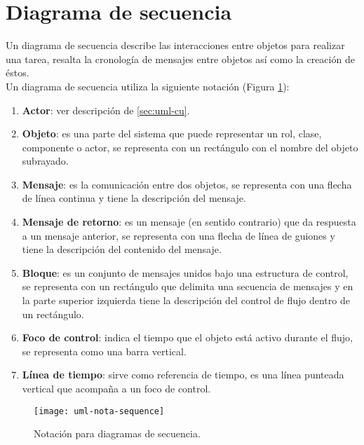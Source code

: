 \section{Diagrama de secuencia}\label{sec:uml-seq}
Un diagrama de secuencia describe las interacciones entre objetos para realizar una tarea, resalta la cronología de mensajes entre objetos así como la creación de éstos\cite{UMLClassroom, SoftwareEngineeringUML}.\\
Un diagrama de secuencia utiliza la siguiente notación\cite{UMLClassroom, SoftwareEngineeringUML} (Figura \ref{fig:uml-nota-sequence}):
\begin{enumerate}
  \item \textbf{Actor}: ver descripción de \ref{sec:uml-cu}.
  \item \textbf{Objeto}: es una parte del sistema que puede representar un rol, clase, componente o actor, se representa con un rectángulo con el nombre del objeto subrayado.
  \item \textbf{Mensaje}: es la comunicación entre dos objetos, se representa con una flecha de línea continua y tiene la descripción del mensaje.
  \item \textbf{Mensaje de retorno}: es un mensaje (en sentido contrario) que da respuesta a un mensaje anterior, se representa con una flecha de línea de guiones y tiene la descripción del contenido del mensaje.
  \item \textbf{Bloque}: es un conjunto de mensajes unidos bajo una estructura de control, se representa con un rectángulo que delimita una secuencia de mensajes y en la parte superior izquierda tiene la descripción del control de flujo dentro de un rectángulo.
  \item \textbf{Foco de control}: indica el tiempo que el objeto está activo durante el flujo, se representa como una barra vertical.
  \item \textbf{Línea de tiempo}: sirve como referencia de tiempo, es una línea punteada vertical que acompaña a un foco de control.
\end{enumerate}
\begin{figure}[h]
  \centering
  \texttt{[image: uml-nota-sequence]}
  \caption{Notación para diagramas de secuencia\cite{SoftwareEngineeringUML}.}
  \label{fig:uml-nota-sequence}
\end{figure}
\pagebreak
